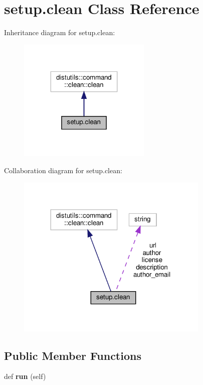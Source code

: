 \hypertarget{classsetup_1_1clean}{}\section{setup.\+clean Class Reference}
\label{classsetup_1_1clean}


Inheritance diagram for setup.\+clean\+:
\nopagebreak
\begin{figure}[H]
\begin{center}
\leavevmode
\includegraphics[width=179pt]{classsetup_1_1clean__inherit__graph}
\end{center}
\end{figure}


Collaboration diagram for setup.\+clean\+:
\nopagebreak
\begin{figure}[H]
\begin{center}
\leavevmode
\includegraphics[width=260pt]{classsetup_1_1clean__coll__graph}
\end{center}
\end{figure}
\subsection*{Public Member Functions}
\begin{DoxyCompactItemize}
\item 
\mbox{\label{classsetup_1_1clean_ac745dd6d3e16dafce2b7f1167b4f6974}} 
def {\bfseries run} (self)
\end{DoxyCompactItemize}
